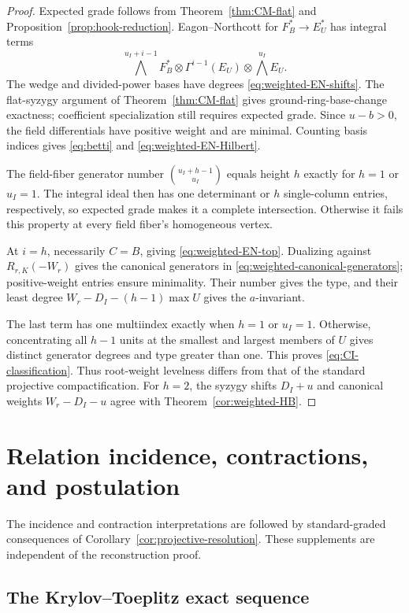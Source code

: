 \documentclass[10pt,fleqn]{article}
\numberwithin{equation}{section}
\begin{document}
\begin{proof}
Expected grade follows from Theorem~\ref{thm:CM-flat} and
Proposition~\ref{prop:hook-reduction}.  Eagon--Northcott for
$F_B^*\to E_U^*$ has integral terms
\[
 \bigwedge^{u_I+i-1}F_B^*\otimes\Gamma^{i-1}(E_U)
       \otimes\bigwedge^{u_I}E_U.
\]
The wedge and divided-power bases have degrees
\eqref{eq:weighted-EN-shifts}.  The flat-syzygy argument of
Theorem~\ref{thm:CM-flat} gives ground-ring-base-change exactness;
coefficient specialization still requires expected grade.
Since $u-b>0$, the field differentials have positive weight and are
minimal.  Counting basis indices gives \eqref{eq:betti} and
\eqref{eq:weighted-EN-Hilbert}.

The field-fiber generator number $\binom{u_I+h-1}{u_I}$ equals height
$h$ exactly for $h=1$ or $u_I=1$.  The integral ideal then has one
determinant or $h$ single-column entries, respectively, so expected
grade makes it a complete intersection.  Otherwise it fails this
property at every field fiber's homogeneous vertex.

At $i=h$, necessarily $C=B$, giving \eqref{eq:weighted-EN-top}.
Dualizing against $R_{r,K}(-W_r)$ gives the canonical generators in
\eqref{eq:weighted-canonical-generators}; positive-weight entries
ensure minimality.  Their number gives the type, and their least degree
$W_r-D_I-(h-1)\max U$ gives the $a$-invariant.

The last term has one multiindex exactly when $h=1$ or $u_I=1$.
Otherwise, concentrating all $h-1$ units at the smallest and largest
members of $U$ gives distinct generator degrees and type greater than one.
This proves \eqref{eq:CI-classification}.  Thus root-weight levelness
differs from that of the standard projective compactification.
For $h=2$, the syzygy shifts $D_I+u$ and canonical weights $W_r-D_I-u$
agree with Theorem~\ref{cor:weighted-HB}.
\end{proof}


\section{Relation incidence, contractions, and postulation}\label{v6:app:postulation}

The incidence and contraction interpretations are followed by
standard-graded consequences of Corollary~\ref{cor:projective-resolution}.
These supplements are independent of the reconstruction proof.


\subsection{The Krylov--Toeplitz exact sequence}
\end{document}
